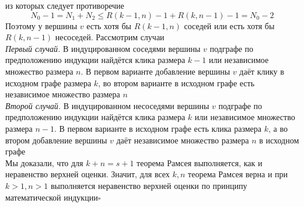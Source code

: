 \documentclass[a4paper]{article}
\begin{document}
из которых следует противоречие $$N_0-1=N_1+N_2 \leqslant R(k-1, n)-1+R(k, n-1)-1=N_0-2$$
\indent Поэтому у вершины $v$ есть хотя бы $R(k-1, n)$ соседей или есть хотя бы $R(k, n-1)$ несоседей. Рассмотрим случаи\\[2mm]
\indent\textit{Первый случай.} В индуцированном соседями вершины $v$ подграфе по предположению индукции найдётся клика размера $k-1$ или независимое множество размера $n$. В первом варианте добавление вершины $v$ даёт клику в исходном графе размера $k$, во втором варианте в исходном графе есть независимое множество размера $n$\\[2mm]
\indent\textit{Второй случай.} В индуцированном несоседями вершины $v$ подграфе по предположению индукции найдётся клика размера $k$ или независимое множество размера $n-1$. В первом варианте в исходном графе есть клика размера $k$, а во втором добавление вершины $v$ даёт независимое множество размера $n$ в исходном графе\\[2mm]
\indent Мы доказали, что для $k+n=s+1$ теорема Рамсея выполняется, как и неравенство верхней оценки. Значит, для всех $k, n$ теорема Рамсея верна и при $k>1, n>1$ выполняется неравенство верхней оценки по принципу математической индукции\hfill$\square$
\label{2.9}
\end{document}
